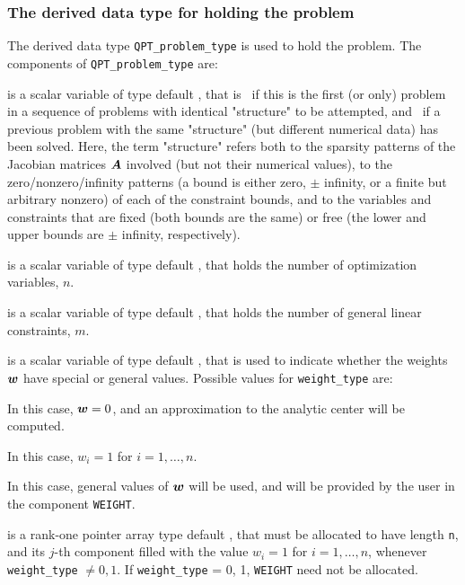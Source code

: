 \documentclass{galahad}
\begin{document}

\subsubsection{The derived data type for holding the problem}\label{typeprob}
The derived data type {\tt QPT\_problem\_type} is used to hold 
the problem. The components of 
{\tt QPT\_problem\_type} 
are:

\begin{description}

 is a scalar variable of type default \logical, 
 that is \true\ if this is the first (or only) problem in a sequence of 
 problems with identical "structure" to be attempted, and \false\ if 
 a previous problem with the same "structure" (but different
 numerical data) has been solved. Here, the term "structure" refers both to 
 the sparsity patterns of the Jacobian matrices ${\bm{A}}$ involved 
 (but not their numerical values), to the zero/nonzero/infinity patterns 
 (a bound is either zero, $\pm$ infinity, or a finite but arbitrary 
 nonzero) of each of the constraint bounds, and to the variables and constraints
 that are fixed (both bounds are the same) or free (the lower and upper
 bounds are $\pm$ infinity, respectively).

 is a scalar variable of type default \integer, 
 that holds the number of optimization variables, $n$.  
              
 is a scalar variable of type default \integer, 
 that holds the number of general linear constraints, $m$.
              
 is a scalar variable of type default \integer, 
that is used to indicate whether the weights ${\bm{w}}$ 
have special or general values. Possible values for {\tt weight\_type} are:
\begin{description}
  In this case, ${\bm{w}} = 0$, and an approximation to the 
  analytic center will be computed.

 In this case, $w_{i} = 1$ for $i = 1, \ldots ,n$.

 In this case, general values of ${\bm{w}}$ will be used,
     and will be provided by the user in the component {\tt WEIGHT}.
\end{description}

 is a rank-one pointer array type default \realdp, that 
must be allocated to have length {\tt n}, and its $j$-th component 
filled with the value $w_{i}  =  1$ for $i = 1, \ldots ,n$, 
whenever {\tt weight\_type} $\neq 0, 1$.
If {\tt weight\_type} {= 0, 1}, {\tt WEIGHT} need not be allocated.


\end{description}
\end{document}
